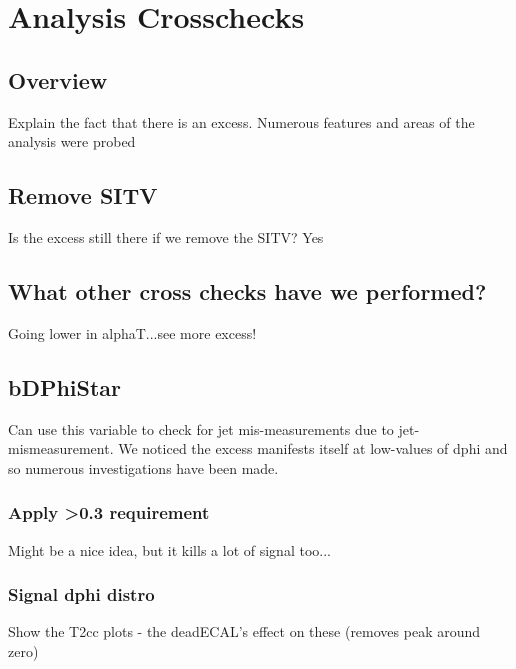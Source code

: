 \chapter{Analysis Crosschecks}

\ifpdf
    \graphicspath{{Chapter8/Figs/Raster/}{Chapter8/Figs/PDF/}{Chapter8/Figs/}}
\else
    \graphicspath{{Chapter8/Figs/Vector/}{Chapter8/Figs/}}
\fi

\section{Overview}  %
\label{sec:crosschecks_overview}
Explain the fact that there is an excess. Numerous features and areas of the 
analysis were probed

\section{Remove SITV}
\label{sec:crosschecks_nositv}
Is the excess still there if we remove the SITV? Yes

\section{What other cross checks have we performed?}
\label{sec:crosschecks_other}
Going lower in alphaT...see more excess!

\section{bDPhiStar}
\label{sec:crosschecks_dphi}
Can use this variable to check for jet mis-measurements due to jet-
mismeasurement. We noticed the excess manifests itself at low-values of dphi and
so numerous investigations have been made.

\subsection{Apply >0.3 requirement}

Might be a nice idea, but it kills a lot of signal too...

\subsection{Signal dphi distro}
Show the T2cc plots - the deadECAL's effect on these (removes peak around zero)

